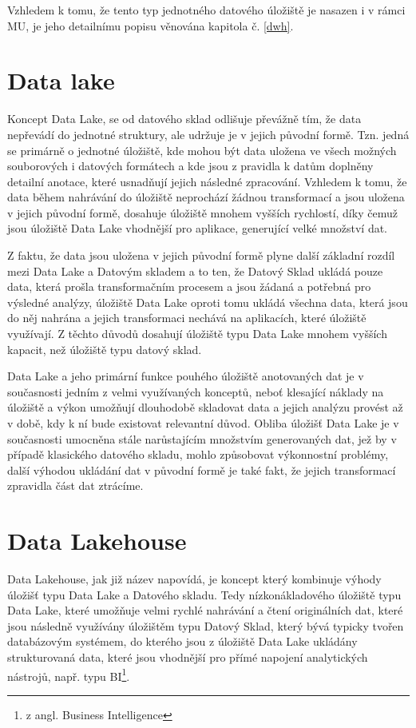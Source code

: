 \documentclass[
  digital,     %
  twoside,     %
  lof,         %
  lot,         %
]{fithesis4}
\begin{document}
Vzhledem k tomu, že tento typ jednotného datového úložiště je nasazen i v rámci MU, je jeho detailnímu popisu věnována kapitola č.  \ref{dwh}.

\section{Data lake}
Koncept Data Lake, se od datového sklad odlišuje převážně tím, že data nepřevádí do jednotné struktury, ale udržuje je v jejich původní formě. Tzn. jedná se primárně o jednotné úložiště, kde mohou být data uložena ve všech možných souborových i datových formátech a kde jsou z pravidla k datům doplněny detailní anotace, které usnadňují jejich následné zpracování.\parencite{Foote19042018} Vzhledem k tomu, že data během nahrávání do úložiště neprochází žádnou transformací a jsou uložena v jejich původní formě, dosahuje úložiště mnohem vyšších rychlostí, díky čemuž jsou úložiště Data Lake vhodnější pro aplikace, generující velké množství dat.\parencite[s.~1]{Harby20221217}

Z faktu, že data jsou uložena v jejich původní formě plyne další základní rozdíl mezi Data Lake a Datovým skladem a to ten, že Datový Sklad ukládá pouze data, která prošla transformačním procesem a jsou žádaná a potřebná pro výsledné analýzy, úložiště Data Lake oproti tomu ukládá všechna data, která jsou do něj nahrána a jejich transformaci nechává na aplikacích, které úložiště využívají. Z těchto důvodů dosahují úložiště typu Data Lake mnohem vyšších kapacit, než úložiště typu datový sklad.\parencite[s.~4]{Nambiar2022} 

Data Lake a jeho primární funkce pouhého úložiště anotovaných dat je v současnosti jedním z velmi využívaných konceptů, neboť klesající náklady na úložiště a výkon umožňují dlouhodobě skladovat data a jejich analýzu provést až v době, kdy k ní bude existovat relevantní důvod. Obliba úložišť Data Lake je v současnosti umocněna stále narůstajícím množstvím generovaných dat, jež by v případě klasického datového skladu, mohlo způsobovat výkonnostní problémy, další výhodou ukládání dat v původní formě je také fakt, že jejich transformací zpravidla část dat ztrácíme.\parencite[s.~ 5]{Nambiar2022}

\section{Data Lakehouse}
Data Lakehouse, jak již název napovídá, je koncept který kombinuje výhody úložišť typu Data Lake a Datového skladu. Tedy nízkonákladového úložiště typu Data Lake, které umožňuje velmi rychlé nahrávání a čtení originálních dat, které jsou následně využívány úložištěm typu Datový Sklad, který bývá typicky tvořen databázovým systémem, do kterého jsou z úložiště Data Lake ukládány strukturovaná data, které jsou vhodnější pro přímé napojení analytických nástrojů, např. typu BI\footnote{z angl. Business Intelligence}.\parencite[s.~3]{Harby20221217}
\end{document}
